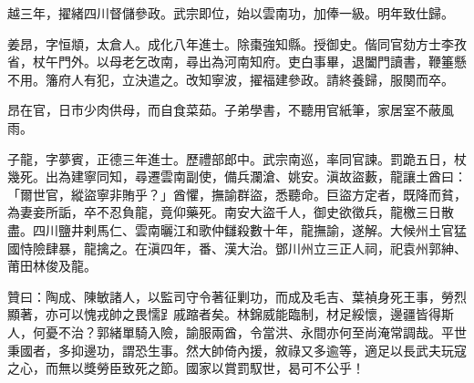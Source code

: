 \begin{pinyinscope}
越三年，擢緒四川督儲參政。武宗即位，始以雲南功，加俸一級。明年致仕歸。

姜昂，字恒頫，太倉人。成化八年進士。除棗強知縣。授御史。偕同官劾方士李孜省，杖午門外。以母老乞改南，尋出為河南知府。吏白事畢，退闔門讀書，鞭箠懸不用。籓府人有犯，立決遣之。改知寧波，擢福建參政。請終養歸，服闋而卒。

昂在官，日市少肉供母，而自食菜茹。子弟學書，不聽用官紙筆，家居室不蔽風雨。

子龍，字夢賓，正德三年進士。歷禮部郎中。武宗南巡，率同官諫。罰跪五日，杖幾死。出為建寧同知，尋遷雲南副使，備兵瀾滄、姚安。滇故盜藪，龍讓土酋曰：「爾世官，縱盜寧非賄乎？」酋懼，撫諭群盜，悉聽命。巨盜方定者，既降而貧，為妻妾所詬，卒不忍負龍，竟仰藥死。南安大盜千人，御史欲徵兵，龍檄三日散盡。四川鹽井剌馬仁、雲南曬江和歌仲讎殺數十年，龍撫諭，遂解。大候州土官猛國恃險肆暴，龍擒之。在滇四年，番、漢大治。鄧川州立三正人祠，祀袁州郭紳、莆田林俊及龍。

贊曰：陶成、陳敏諸人，以監司守令著征剿功，而成及毛吉、葉禎身死王事，勞烈顯著，亦可以愧戎帥之畏懦𧾷戚蹜者矣。林錦威能臨制，材足綏懷，邊疆皆得斯人，何憂不治？郭緒單騎入險，諭服兩酋，令當洪、永間亦何至尚淹常調哉。平世秉國者，多抑邊功，謂恐生事。然大帥倚內援，敘祿又多逾等，適足以長武夫玩寇之心，而無以獎勞臣致死之節。國家以賞罰馭世，曷可不公乎！


\end{pinyinscope}